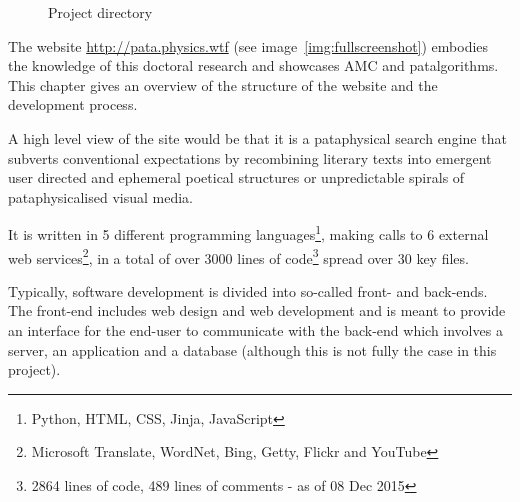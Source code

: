 \begin{figure}
  \centering
  \caption[Project directory]{Project directory}
  \label{fig:dir}
  \vspace{-2cm}
\end{figure}

The website \url{http://pata.physics.wtf} (see image~\ref{img:fullscreenshot}) embodies the knowledge of this doctoral research and showcases \acf{AMC} and patalgorithms. This chapter gives an overview of the structure of the website and the development process.

A high level view of the site would be that it is a pataphysical search engine that subverts conventional expectations by recombining literary texts into emergent user directed and ephemeral poetical structures or unpredictable spirals of pataphysicalised visual media. 

It is written in 5 different programming languages\footnote{Python, \ac{HTML}, \ac{CSS}, Jinja, JavaScript}, making calls to 6 external web services\footnote{Microsoft Translate, WordNet, Bing, Getty, Flickr and YouTube}, in a total of over \num{3000} lines of code\footnote{\num{2864} lines of code, \num{489} lines of comments - as of 08 Dec 2015} spread over 30 key files. 

Typically, software development is divided into so-called front- and back-ends. The front-end includes web design and web development and is meant to provide an interface for the end-user to communicate with the back-end which involves a server, an application and a database (although this is not fully the case in this project).

